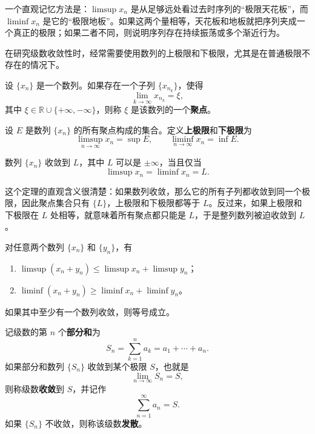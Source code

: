 一个直观记忆方法是：$\limsup x_n$ 是从足够远处看过去时序列的“极限天花板”，而 $\liminf x_n$ 是它的“极限地板”。如果这两个量相等，天花板和地板就把序列夹成一个真正的极限；如果二者不同，则说明序列存在持续振荡或多个渐近行为。

在研究级数收敛性时，经常需要使用数列的上极限和下极限，尤其是在普通极限不存在的情况下。

\begin{definition}[聚点]
设 $\{x_n\}$ 是一个数列。如果存在一个子列 $\{x_{n_k}\}$，使得
\[
    \lim_{k\to\infty}x_{n_k}=\xi,
\]
其中 $\xi\in\mathbb{R}\cup\{+\infty,-\infty\}$，则称 $\xi$ 是该数列的一个\textbf{聚点}。
\end{definition}

\begin{definition}[上极限与下极限]
设 $E$ 是数列 $\{x_n\}$ 的所有聚点构成的集合。定义\textbf{上极限}和\textbf{下极限}为
\[
    \limsup_{n\to\infty}x_n=\sup E,
    \qquad
    \liminf_{n\to\infty}x_n=\inf E.
\]
\end{definition}

\begin{theorem}
数列 $\{x_n\}$ 收敛到 $L$，其中 $L$ 可以是 $\pm\infty$，当且仅当
\[
    \limsup x_n=\liminf x_n=L.
\]
\end{theorem}

这个定理的直观含义很清楚：如果数列收敛，那么它的所有子列都收敛到同一个极限，因此聚点集合只有 $\{L\}$，上极限和下极限都等于 $L$。反过来，如果上极限和下极限在 $L$ 处相等，就意味着所有聚点都只能是 $L$，于是整列数列被迫收敛到 $L$。

\begin{property}
对任意两个数列 $\{x_n\}$ 和 $\{y_n\}$，有
\begin{enumerate}
    \item $\limsup (x_n+y_n)\leq \limsup x_n+\limsup y_n$；
    \item $\liminf (x_n+y_n)\geq \liminf x_n+\liminf y_n$。
\end{enumerate}
如果其中至少有一个数列收敛，则等号成立。
\end{property}

\begin{definition}[级数的收敛]
记级数的第 $n$ 个\textbf{部分和}为
\[
    S_n=\sum_{k=1}^{n}a_k=a_1+\cdots+a_n.
\]
如果部分和数列 $\{S_n\}$ 收敛到某个极限 $S$，也就是
\[
    \lim_{n\to\infty}S_n=S,
\]
则称级数\textbf{收敛}到 $S$，并记作
\[
    \sum_{n=1}^{\infty}a_n=S.
\]
如果 $\{S_n\}$ 不收敛，则称该级数\textbf{发散}。
\end{definition}

